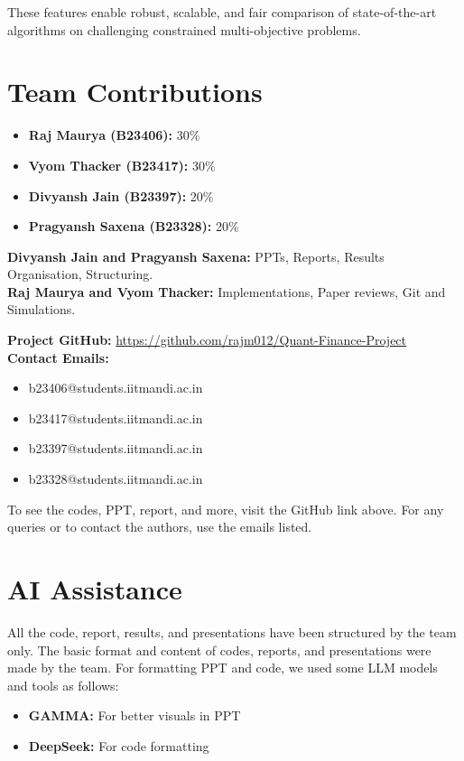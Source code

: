 \documentclass[12pt]{article}
\begin{document}
These features enable robust, scalable, and fair comparison of state-of-the-art algorithms on challenging constrained multi-objective problems.


\section{Team Contributions}

\begin{itemize}
    \item \textbf{Raj Maurya (B23406):} 30\% 
    \item \textbf{Vyom Thacker (B23417):} 30\%
    \item \textbf{Divyansh Jain (B23397):} 20\%
    \item \textbf{Pragyansh Saxena (B23328):} 20\%
\end{itemize}

\vspace{1em}
\textbf{Divyansh Jain and Pragyansh Saxena:} PPTs, Reports, Results Organisation, Structuring.\\
\textbf{Raj Maurya and Vyom Thacker:} Implementations, Paper reviews, Git and Simulations.

\vspace{1em}
\noindent
\textbf{Project GitHub:} \url{https://github.com/rajm012/Quant-Finance-Project}\\
\textbf{Contact Emails:}
\begin{itemize}
    \item b23406@students.iitmandi.ac.in
    \item b23417@students.iitmandi.ac.in
    \item b23397@students.iitmandi.ac.in
    \item b23328@students.iitmandi.ac.in
\end{itemize}

To see the codes, PPT, report, and more, visit the GitHub link above. For any queries or to contact the authors, use the emails listed.



\section{AI Assistance}

All the code, report, results, and presentations have been structured by the team only. The basic format and content of codes, reports, and presentations were made by the team. For formatting PPT and code, we used some LLM models and tools as follows:

\begin{itemize}
    \item \textbf{GAMMA:} For better visuals in PPT
    \item \textbf{DeepSeek:} For code formatting
\end{itemize}
\end{document}
